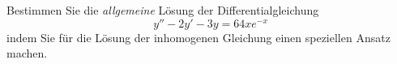 \begin{atiTask}[
  title = Inhomogene Differentialgleichung 2. Ordnung
]
Bestimmen Sie die \textit{allgemeine} Lösung der Differentialgleichung
\begin{equation*}
y''-2y'-3y=64xe^{-x}
\end{equation*}
indem Sie für die Lösung der inhomogenen Gleichung einen speziellen Ansatz machen.
\end{atiTask}
